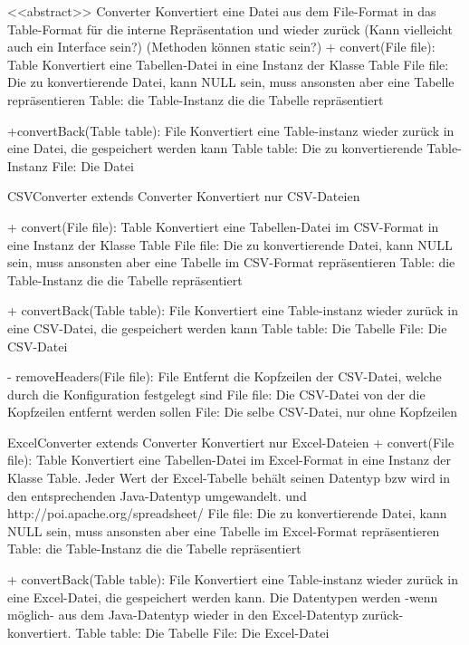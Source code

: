 <<abstract>> Converter
	Konvertiert eine Datei aus dem File-Format in das Table-Format für die interne Repräsentation und wieder zurück
	(Kann vielleicht auch ein Interface sein?)
	(Methoden können static sein?)
+ convert(File file): Table
	Konvertiert eine Tabellen-Datei in eine Instanz der Klasse Table
		File file: Die zu konvertierende Datei, kann NULL sein, muss ansonsten aber eine Tabelle repräsentieren
			Table: die Table-Instanz die die Tabelle repräsentiert

+convertBack(Table table): File
	Konvertiert eine Table-instanz wieder zurück in eine Datei, die gespeichert werden kann
		Table table: Die zu konvertierende Table-Instanz
			File: Die Datei
	
			
			
CSVConverter extends Converter
	Konvertiert nur CSV-Dateien
	
+ convert(File file): Table
	Konvertiert eine Tabellen-Datei im CSV-Format in eine Instanz der Klasse Table
		File file: Die zu konvertierende Datei, kann NULL sein, muss ansonsten aber eine Tabelle im CSV-Format repräsentieren
			Table: die Table-Instanz die die Tabelle repräsentiert
			
+ convertBack(Table table): File
	Konvertiert eine Table-instanz wieder zurück in eine CSV-Datei, die gespeichert werden kann
		Table table: Die Tabelle
			File: Die CSV-Datei
			
- removeHeaders(File file): File
	Entfernt die Kopfzeilen der CSV-Datei, welche durch die Konfiguration festgelegt sind
		File file: Die CSV-Datei von der die Kopfzeilen entfernt werden sollen
			File: Die selbe CSV-Datei, nur ohne Kopfzeilen
			


ExcelConverter extends Converter
	Konvertiert nur Excel-Dateien
+ convert(File file): Table
	Konvertiert eine Tabellen-Datei im Excel-Format in eine Instanz der Klasse Table.
	Jeder Wert der Excel-Tabelle behält seinen Datentyp bzw wird in den entsprechenden Java-Datentyp umgewandelt.
	und http://poi.apache.org/spreadsheet/
		File file: Die zu konvertierende Datei, kann NULL sein, muss ansonsten aber eine Tabelle im Excel-Format repräsentieren
			Table: die Table-Instanz die die Tabelle repräsentiert
			
+ convertBack(Table table): File
	Konvertiert eine Table-instanz wieder zurück in eine Excel-Datei, die gespeichert werden kann.
	Die Datentypen werden -wenn möglich- aus dem Java-Datentyp wieder in den Excel-Datentyp zurück-konvertiert.
		Table table: Die Tabelle
			File: Die Excel-Datei